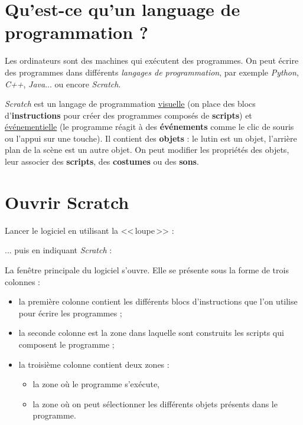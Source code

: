 \section{Qu'est-ce qu'un language de programmation ?} 

Les ordinateurs sont des machines qui exécutent des programmes. On peut écrire des programmes dans différents \emph{langages de programmation}, par exemple \emph{Python}, \emph{C++}, \emph{Java}... ou encore \emph{Scratch}.

\emph{Scratch} est un langage de programmation \underline{visuelle} (on place des blocs d'\textbf{instructions} pour créer des programmes composés de \textbf{scripts}) et \underline{événementielle} (le programme réagit à des \textbf{événements} comme le clic de souris ou l'appui sur une touche). Il contient des \textbf{objets} : le lutin est un objet, l'arrière plan de la scène est un autre objet. On peut modifier les propriétés des objets, leur associer des \textbf{scripts}, des \textbf{costumes} ou des \textbf{sons}.   



\section{Ouvrir Scratch}

Lancer le logiciel en utilisant la <<\,loupe\,>> :


... puis en indiquant \emph{Scratch} :



La fenêtre principale du logiciel s'ouvre. Elle se présente sous la forme de trois colonnes :

\begin{itemize}
\item la première colonne contient les différents blocs d'instructions que l'on utilise pour écrire les programmes ;
\item la seconde colonne est la zone dans laquelle sont construits les scripts qui composent le programme ;
\item la troisième colonne contient deux zones :
        \begin{itemize}
        \item la zone où le programme s'exécute,
        \item la zone où on peut sélectionner les différents objets présents dans le programme.
        \end{itemize}
\end{itemize}

